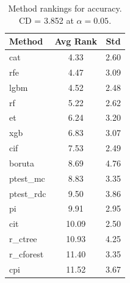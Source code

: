 \begin{table}[h]
\centering
\caption{Method rankings for accuracy. CD = 3.852 at $\alpha=0.05$.}
\label{tab:ranks_accuracy}
\begin{tabular}{lcc}
\toprule
Method & Avg Rank & Std \\
\midrule
cat & 4.33 & 2.60 \\
rfe & 4.47 & 3.09 \\
lgbm & 4.52 & 2.48 \\
rf & 5.22 & 2.62 \\
et & 6.24 & 3.20 \\
xgb & 6.83 & 3.07 \\
cif & 7.53 & 2.49 \\
boruta & 8.69 & 4.76 \\
ptest_mc & 8.83 & 3.35 \\
ptest_rdc & 9.50 & 3.86 \\
pi & 9.91 & 2.95 \\
cit & 10.09 & 2.50 \\
r_ctree & 10.93 & 4.25 \\
r_cforest & 11.40 & 3.35 \\
cpi & 11.52 & 3.67 \\
\bottomrule
\end{tabular}
\end{table}